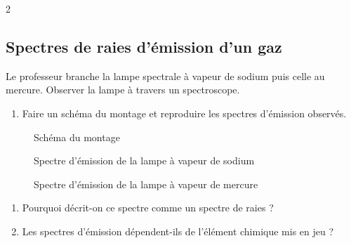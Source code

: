 \documentclass[a3paper,landscape,11pt,fleqn]{article}%
\begin{document}
\begin{multicols}{2}
		\subsection{Spectres de raies d'émission d'un gaz}
		Le professeur branche la lampe spectrale à vapeur de sodium puis celle au mercure. Observer la lampe à travers un spectroscope.
		\begin{enumerate}
			\item Faire un schéma du montage et reproduire les spectres d'émission observés.
		\end{enumerate}
		\begin{figure}[h!]
			\centering
			\caption*{Schéma du montage}
			\label{fig:enter-label}
		\end{figure}
		\begin{figure}[h!]
			\centering
			\caption*{Spectre d'émission de la lampe à vapeur de sodium}
			\label{fig:enter-label}
		\end{figure}
		\begin{figure}[h!]
			\centering
			\caption*{Spectre d'émission de la lampe à vapeur de mercure}
			\label{fig:enter-label}
		\end{figure}
		
		\begin{enumerate}[resume]
			\item Pourquoi décrit-on ce spectre comme un spectre de raies ?
			\item Les spectres d'émission dépendent-ils de l'élément chimique mis en jeu ?
		\end{enumerate}
		
		\noindent{}
\end{multicols}
	
\end{document}
